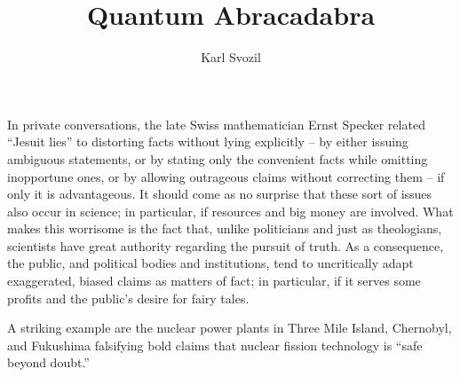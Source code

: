 \documentclass[%
 preprint,
 showpacs,
 showkeys,
 preprintnumbers,
 amsmath,amssymb,
 aps,
  pra,
  longbibliography,
 ]{revtex4-1}
\begin{document}
\sloppy

\title{Quantum Abracadabra}



\author{Karl Svozil}
 




\maketitle

In private conversations, the late Swiss mathematician Ernst Specker related ``Jesuit lies''
to distorting facts without lying explicitly --
by either
issuing ambiguous statements,
or
by stating only the convenient facts while omitting inopportune ones,
or
by allowing outrageous claims without correcting them
--
if only it is advantageous.
It should come as no surprise that these sort of issues also occur in science; in particular,
if resources and big money are involved.
What makes this worrisome is the fact that, unlike politicians and just as theologians, scientists have great authority regarding the pursuit of truth.
As a consequence, the public, and political bodies and institutions,
tend to uncritically adapt exaggerated, biased claims as matters of fact; in particular, if it serves some profits and the public's desire for
fairy tales.

A striking example are the nuclear power plants in Three Mile Island, Chernobyl, and Fukushima falsifying bold claims that nuclear fission technology is ``safe beyond doubt.''
\end{document}
